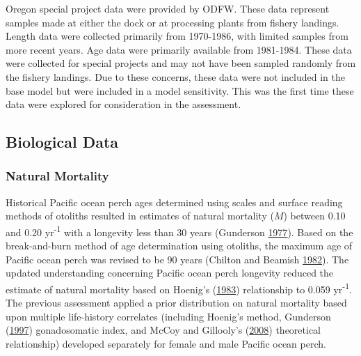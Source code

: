 \documentclass[12pt,]{article}
\begin{document}
Oregon special project data were provided by ODFW. These data represent
samples made at either the dock or at processing plants from fishery
landings. Length data were collected primarily from 1970-1986, with
limited samples from more recent years. Age data were primarily
available from 1981-1984. These data were collected for special projects
and may not have been sampled randomly from the fishery landings. Due to
these concerns, these data were not included in the base model but were
included in a model sensitivity. This was the first time these data were
explored for consideration in the assessment.

\subsection{Biological Data}\label{biological-data}

\subsubsection{Natural Mortality}\label{natural-mortality}

Historical Pacific ocean perch ages determined using scales and surface
reading methods of otoliths resulted in estimates of natural mortality
(\(M\)) between 0.10 and 0.20 yr\textsuperscript{-1} with a longevity
less than 30 years (Gunderson
\protect\hyperlink{ref-gunderson_population_1977}{1977}). Based on the
break-and-burn method of age determination using otoliths, the maximum
age of Pacific ocean perch was revised to be 90 years (Chilton and
Beamish \protect\hyperlink{ref-chilton_age_1982}{1982}). The updated
understanding concerning Pacific ocean perch longevity reduced the
estimate of natural mortality based on Hoenig's
(\protect\hyperlink{ref-hoenig_empirical_1983}{1983}) relationship to
0.059 yr\textsuperscript{-1}. The previous assessment applied a prior
distribution on natural mortality based upon multiple life-history
correlates (including Hoenig's method, Gunderson
(\protect\hyperlink{ref-gunderson_trade-off_1997}{1997}) gonadosomatic
index, and McCoy and Gillooly's
(\protect\hyperlink{ref-mccoy_predicting_2008}{2008}) theoretical
relationship) developed separately for female and male Pacific ocean
perch.
\end{document}
